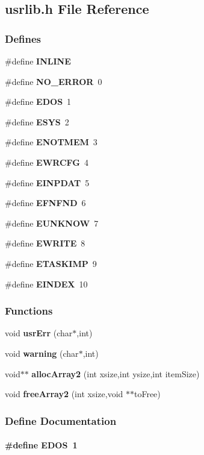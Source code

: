 \subsection{usrlib.h File Reference}
\label{usrlib.h}
\subsubsection*{Defines}
\begin{CompactItemize}
\item 
\#define {\bf INLINE}
\item 
\#define {\bf NO\_\-ERROR}\ 0
\item 
\#define {\bf EDOS}\ 1
\item 
\#define {\bf ESYS}\ 2
\item 
\#define {\bf ENOTMEM}\ 3
\item 
\#define {\bf EWRCFG}\ 4
\item 
\#define {\bf EINPDAT}\ 5
\item 
\#define {\bf EFNFND}\ 6
\item 
\#define {\bf EUNKNOW}\ 7
\item 
\#define {\bf EWRITE}\ 8
\item 
\#define {\bf ETASKIMP}\ 9
\item 
\#define {\bf EINDEX}\ 10
\end{CompactItemize}
\subsubsection*{Functions}
\begin{CompactItemize}
\item 
void {\bf usr\-Err} (char$\ast$,int)
\item 
void {\bf warning} (char$\ast$,int)
\item 
void$\ast$$\ast$ {\bf alloc\-Array2} (int xsize,int ysize,int item\-Size)
\item 
void {\bf free\-Array2} (int xsize,void $\ast$$\ast$to\-Free)
\end{CompactItemize}


\subsubsection{Define Documentation}
\label{usrlib.h_a2}
\paragraph{\setlength{\rightskip}{0pt plus 5cm}\#define EDOS\ 1}\hfill



